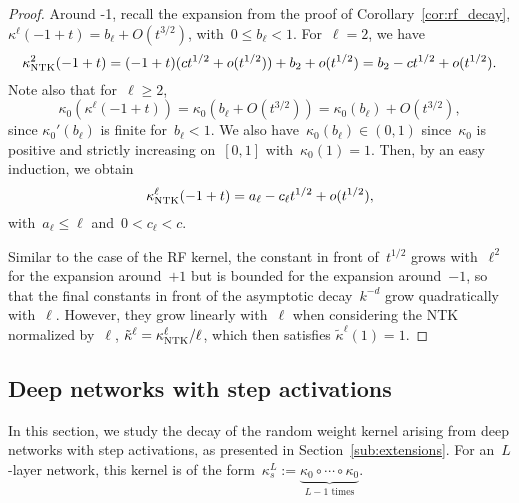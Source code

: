 \begin{proof}
Around -1, recall the expansion from the proof of Corollary~\ref{cor:rf_decay}, $\kappa^\ell(-1+t) = b_\ell + O(t^{3/2})$, with~$0 \leq b_\ell < 1$. For~$\ell = 2$, we have
\begin{equation*}
\kappa_{{\text{NTK}}}^2(-1+t) = (-1+t)(ct^{1/2} + o(t^{1/2})) + b_2 + o(t^{1/2}) = b_2 - ct^{1/2} + o(t^{1/2}).
\end{equation*}
Note also that for~$\ell \geq 2$,
\begin{equation*}
\kappa_0(\kappa^\ell(-1+t)) = \kappa_0(b_\ell + O(t^{3/2})) = \kappa_0(b_\ell) + O(t^{3/2}),
\end{equation*}
since $\kappa_0'(b_\ell)$ is finite for~$b_\ell < 1$. We also have~$\kappa_0(b_\ell) \in (0, 1)$ since~$\kappa_0$ is positive and strictly increasing on~$[0, 1]$ with~$\kappa_0(1) = 1$.
Then, by an easy induction, we obtain
\begin{equation*}
\kappa_{{\text{NTK}}}^\ell(-1+t) = a_\ell - c_\ell t^{1/2} + o(t^{1/2}),
\end{equation*}
with~$a_\ell \leq \ell$ and~$0 < c_\ell < c$.

Similar to the case of the RF kernel, the constant in front of~$t^{1/2}$ grows with~$\ell^2$ for the expansion around~$+1$ but is bounded for the expansion around~$-1$, so that the final constants in front of the asymptotic decay~$k^{-d}$ grow quadratically with~$\ell$. However, they grow linearly with~$\ell$ when considering the NTK normalized by~$\ell$, $\tilde \kappa^\ell = \kappa_{{\text{NTK}}}^\ell / \ell$, which then satisfies $\tilde \kappa^\ell(1) = 1$.

\end{proof}


\subsection{Deep networks with step activations} %
\label{sub:deep_step_decay}

In this section, we study the decay of the random weight kernel arising from deep networks with step activations, as presented in Section~\ref{sub:extensions}.
For an~$L$-layer network, this kernel is of the form~$\kappa_s^L := \underbrace{\kappa_0 \circ \cdots \circ \kappa_0}_{L-1\text{ times}}$.

